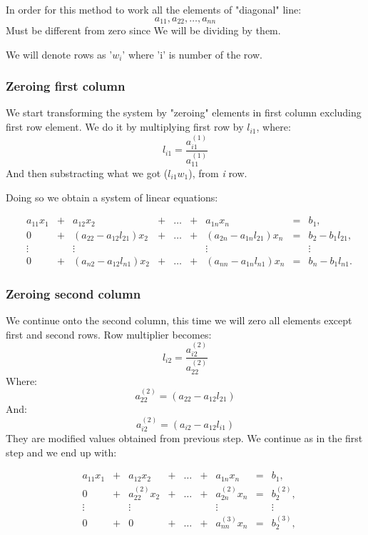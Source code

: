 \documentclass[12pt]{report}
\begin{document}
In order for this method to work all the elements of "diagonal" line:
\[ a_{11}, a_{22}, \dots, a_{nn} \]
Must be different from zero since We will be dividing by them.

We will denote rows as '$w_i$' where 'i' is number of the row.

\subsubsection{Zeroing first column}
We start transforming the system by "zeroing" elements in first column excluding first row element. We do it by multiplying first row by $l_{i1}$, where:
\[ l_{i1} = \frac{ a_{i1}^{(1)} }
{ a_{11}^{(1)} }  \]
And then substracting what we got ($ l_{i1}w_1 $), from \textit{i} row.

Doing so we obtain a system of linear equations:

\[
\begin{matrix}

&a_{11}x_1 &{}+&a_{12}x_2&+&\dots&+&a_{1n}x_n &=&b_1,\\

&0 &{}+&(a_{22} - a_{12}l_{21})x_2&{}+&\dots&{}+&(a_{2n} - a_{1n}l_{21})x_n &=&b_2 - b_{1}l_{21},\\

&\vdots    &&\vdots      & &     & &  \vdots  & &\vdots\\

&0&{}+&(a_{n2} - a_{12}l_{n1})x_2&+&\dots &+&(a_{nn} - a_{1n}l_{n1})x_n&=&b_n - b_{1}l_{n1}.

\end{matrix}
\]

\subsubsection{Zeroing second column}
We continue onto the second column, this time we will zero all elements except first and second rows.
Row multiplier becomes:
\[ l_{i2} = \frac{ a_{i2}^{(2)} }{ a_{22}^{(2)} } \]
Where:
\[ a_{22}^{(2)} = (a_{22} - a_{12}l_{21}) \]
And:
\[ a_{i2}^{(2)} = (a_{i2} - a_{12}l_{i1}) \]
\newpage
They are modified values obtained from previous step.
We continue as in the first step and we end up with:

\[
\begin{matrix}

&a_{11}x_1 &{}+&a_{12}x_2&+&\dots&+&a_{1n}x_n &=&b_1,\\

&0 &{}+& a_{22}^{(2)}x_2&{}+&\dots&{}+& a_{2n}^{(2)}x_n &=&b_2^{(2)},\\

&\vdots    &&\vdots      & &     & &  \vdots  & &\vdots\\

&0 &{}+& 0 &{}+&\dots&{}+& a_{nn}^{(3)}x_n &=&b_2^{(3)},

\end{matrix}
\]
\end{document}
